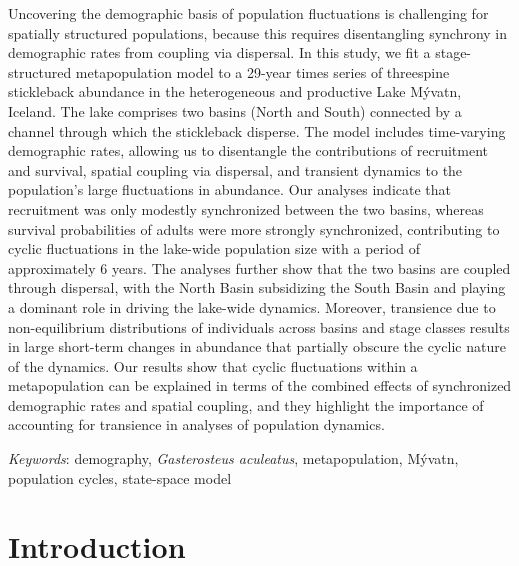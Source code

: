 \documentclass[11pt]{article}
\begin{document}
Uncovering the demographic basis of population fluctuations is challenging 
for spatially structured populations, 
because this requires disentangling synchrony in demographic rates 
from coupling via dispersal. 
In this study, we fit a stage-structured metapopulation model to a 29-year times series 
of threespine stickleback abundance in the heterogeneous 
and productive Lake M\'{y}vatn, Iceland. 
The lake comprises two basins (North and South) connected by a channel 
through which the stickleback disperse. 
The model includes time-varying demographic rates, 
allowing us to disentangle the contributions of recruitment and survival, 
spatial coupling via dispersal, and transient dynamics 
to the population’s large fluctuations in abundance. 
Our analyses indicate that recruitment was only modestly synchronized between the two basins, 
whereas survival probabilities of adults were more strongly synchronized, 
contributing to cyclic fluctuations in the lake-wide population size 
with a period of approximately 6 years. 
The analyses further show that the two basins are coupled through dispersal, 
with the North Basin subsidizing the South Basin and playing a dominant role 
in driving the lake-wide dynamics. 
Moreover, transience due to non-equilibrium distributions of individuals 
across basins and stage classes results in large short-term changes in abundance 
that partially obscure the cyclic nature of the dynamics. 
Our results show that cyclic fluctuations within a metapopulation 
can be explained in terms of the combined effects 
of synchronized demographic rates and spatial coupling, 
and they highlight the importance 
of accounting for transience in analyses of population dynamics.


\bigskip

\textit{Keywords}: {demography, \textit{Gasterosteus aculeatus}, metapopulation,
                    M\'{y}vatn, population cycles, state-space model}

\clearpage




\section*{Introduction} \label{introduction}
\end{document}
